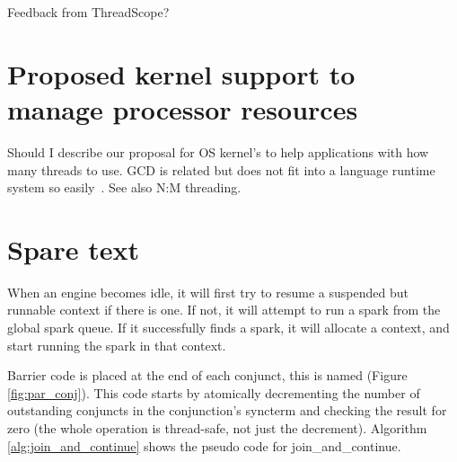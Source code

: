 Feedback from ThreadScope?

\section{Proposed kernel support to manage processor resources}

    
Should I describe our proposal for OS kernel's to help
applications with how many threads to use.
GCD is related but does not fit into a language runtime system so
easily~\cite{apple_gcd}.
See also N:M threading.

\section{Spare text}


%
%

When an engine becomes idle, it will first try
to resume a suspended but runnable context if there is one.
If not, it will attempt to run a spark from the global spark queue.
If it successfully finds a spark, it will allocate a context,
and start running the spark in that context.


Barrier code is placed at the end of each conjunct,
this is named  (Figure \ref{fig:par_conj}).
This code starts by atomically decrementing the number of outstanding
conjuncts in the conjunction's syncterm and checking the result for zero
(the whole operation is thread-safe, not just the decrement).
Algorithm \ref{alg:join_and_continue} shows the pseudo code for
join\_and\_continue.



